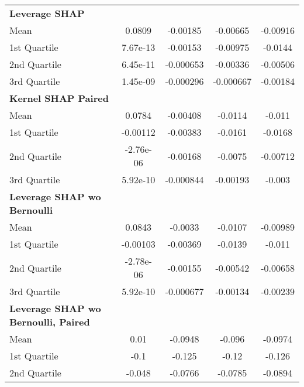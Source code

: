 {\begin{tabular} {lcccc}
\textbf{Leverage SHAP} &  &  &  &  \\ 
\hspace{7pt}Mean & 0.0809 & -0.00185 & -0.00665 & -0.00916 \\ 
\hspace{7pt}1st Quartile & 7.67e-13 & -0.00153 & -0.00975 & -0.0144 \\ 
\hspace{7pt}2nd Quartile & 6.45e-11 & -0.000653 & -0.00336 & -0.00506 \\ 
\hspace{7pt}3rd Quartile & 1.45e-09 & -0.000296 & -0.000667 & -0.00184 \\ 
\addlinespace[1ex] 
\textbf{Kernel SHAP Paired} &  &  &  &  \\ 
\hspace{7pt}Mean & 0.0784 & -0.00408 & -0.0114 & -0.011 \\ 
\hspace{7pt}1st Quartile & -0.00112 & -0.00383 & -0.0161 & -0.0168 \\ 
\hspace{7pt}2nd Quartile & -2.76e-06 & -0.00168 & -0.0075 & -0.00712 \\ 
\hspace{7pt}3rd Quartile & 5.92e-10 & -0.000844 & -0.00193 & -0.003 \\ 
\addlinespace[1ex] 
\textbf{Leverage SHAP wo Bernoulli} &  &  &  &  \\ 
\hspace{7pt}Mean & 0.0843 & -0.0033 & -0.0107 & -0.00989 \\ 
\hspace{7pt}1st Quartile & -0.00103 & -0.00369 & -0.0139 & -0.011 \\ 
\hspace{7pt}2nd Quartile & -2.78e-06 & -0.00155 & -0.00542 & -0.00658 \\ 
\hspace{7pt}3rd Quartile & 5.92e-10 & -0.000677 & -0.00134 & -0.00239 \\ 
\addlinespace[1ex] 
\textbf{Leverage SHAP wo Bernoulli, Paired} &  &  &  &  \\ 
\hspace{7pt}Mean & 0.01 & -0.0948 & -0.096 & -0.0974 \\ 
\hspace{7pt}1st Quartile & -0.1 & -0.125 & -0.12 & -0.126 \\ 
\hspace{7pt}2nd Quartile & -0.048 & -0.0766 & -0.0785 & -0.0894 \\ 

\end{tabular}}
